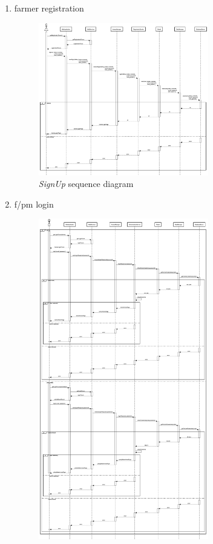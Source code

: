 \begin{enumerate}
    \item farmer registration
    \begin{figure}[H]
        \begin{center}
        \includegraphics[width=0.7\textwidth]{sequance/signup.png}
        \caption{\emph{SignUp} sequence diagram}
        \label{fig:sequence1}
        \end{center}
    \end{figure}
    \item f/pm login
    \begin{figure}[H]
        \begin{center}
        \includegraphics[width=0.7\textwidth]{sequance/login.png}

\end{center}
\end{figure}
\end{enumerate}
